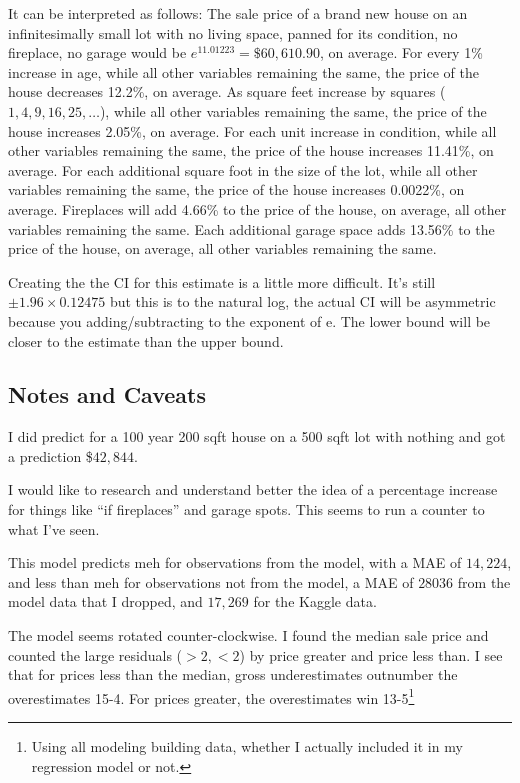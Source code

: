 \documentclass[twocolumn,11pt]{article}
\begin{document}
It can be interpreted as follows:
The sale price of a brand new house on an infinitesimally small lot with no living space,
panned for its condition, no fireplace, no garage would be $e^{11.01223}=\$60,610.90$, on average.
For every 1\% increase in age, while all other variables remaining the same, the price of the house decreases 12.2\%, on average.
As square feet increase by squares (${1,4,9,16,25,\ldots}$), while all other variables remaining the same, the price of the house increases 2.05\%, on average.
For each unit increase in condition, while all other variables remaining the same, the price of the house increases 11.41\%, on average.
For each additional square foot in the size of the lot, while all other variables remaining the same, the price of the house increases 0.0022\%, on average.
Fireplaces will add 4.66\% to the price of the house, on average, all other variables remaining the same.
Each additional garage space adds 13.56\% to the price of the house, on average, all other variables remaining the same.

Creating the the CI for this estimate is a little more difficult.
It's still $\pm 1.96 \times 0.12475$ but this is to the natural log,
the actual CI will be asymmetric because you adding/subtracting to the exponent of e.
The lower bound will be closer to the estimate than the upper bound.


\subsection{Notes and Caveats}
I did predict for a 100 year 200 sqft house on a 500 sqft lot with nothing and got a prediction \$$42,844$.

I would like to research and understand better the idea of a percentage increase for things like ``if fireplaces'' and garage spots. This seems to run a counter to what I've seen.

This model predicts meh for observations from the model, with a MAE of $14,224$,
and less than meh for observations not from the model, a MAE of $28036$ from the model data that I dropped, 
and $17,269$ for the Kaggle data.

The model seems rotated counter-clockwise.
I found the median sale price and counted the large residuals ($>2, <2$)
by price greater and price less than.
I see that for prices less than the median,
gross underestimates outnumber the overestimates 15-4.
For prices greater, the overestimates win 13-5\footnote{Using all modeling building data,
whether I actually included it in my regression model or not.}
\end{document}
